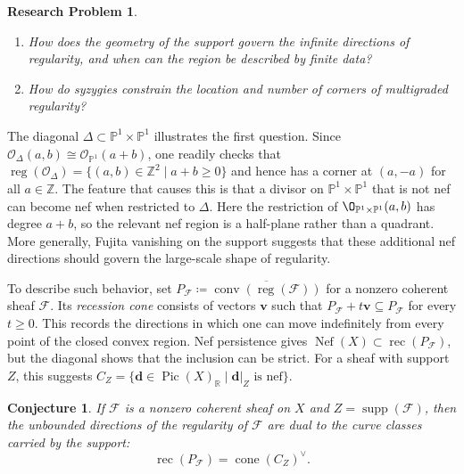 \documentclass[11pt,reqno]{amsart}
\newtheorem{problem}[lemma]{Research Problem}
\newtheorem{conjecture}[lemma]{Conjecture}
\theoremstyle{remark}
\newcommand{\reg}{\operatorname{reg}}
\newcommand{\Pic}{\operatorname{Pic}}
\newcommand{\supp}{\operatorname{supp}}
\newcommand{\Nef}{\operatorname{Nef}}
\newcommand{\cone}{\operatorname{cone}}
\newcommand{\dd}{\mathbf{d}}
\newcommand{\vv}{\mathbf{v}}
\newcommand{\PP}{\mathbb{P}}
\newcommand{\RR}{\mathbb{R}}
\newcommand{\ZZ}{\mathbb{Z}}
\newcommand{\cF}{\mathcal{F}}
\newcommand{\cO}{\mathcal{O}}
\begin{document}
\begin{problem}\label{prob:corners-and-directions}
\begin{enumerate}[leftmargin=*,nosep]
\item How does the geometry of the support govern the infinite directions of regularity, and when can the region be described by finite data?
\item How do syzygies constrain the location and number of corners of multigraded regularity?
\end{enumerate}
\end{problem}

The diagonal $\Delta\subset\PP^1\times\PP^1$ illustrates the first question. Since $\cO_\Delta(a,b)\cong\cO_{\PP^1}(a+b)$, one readily checks that $\reg(\cO_{\Delta}) = \{(a,b)\in\ZZ^2\mid a+b\geq0\}$ and hence has a corner at $(a,-a)$ for all $a\in \ZZ$. The feature that causes this is that a divisor on $\PP^1\times \PP^1$ that is not nef can become nef when restricted to $\Delta$. Here the restriction of $\O_{\PP^1\times\PP^1}(a,b)$ has degree $a+b$, so the relevant nef region is a half-plane rather than a quadrant. More generally, Fujita vanishing on the support suggests that these additional nef directions should govern the large-scale shape of regularity.


To describe such behavior, set $P_{\cF}\coloneqq \overline{\operatorname{conv}(\reg(\cF))}$ for a nonzero coherent sheaf $\cF$. Its \emph{recession cone} consists of vectors $\vv$ such that $P_{\cF}+t\vv\subseteq P_{\cF}$ for every $t\geq0$. This records the directions in which one can move indefinitely from every point of the closed convex region. Nef persistence gives $\Nef(X)\subset\operatorname{rec}(P_{\cF})$, but the diagonal shows that the inclusion can be strict. For a sheaf with support $Z$, this suggests $C_Z=\{\dd\in\Pic(X)_{\RR}\mid\dd|_Z\text{ is nef}\}$.

\begin{conjecture}\label{conj:support-cone-duality}
If $\cF$ is a nonzero coherent sheaf on $X$ and $Z=\supp(\cF)$, then the unbounded directions of the regularity of $\cF$ are dual to the curve classes carried by the support:
\[
\operatorname{rec}(P_{\cF})=\cone(C_Z)^{\vee}.
\]
\end{conjecture}
\end{document}
